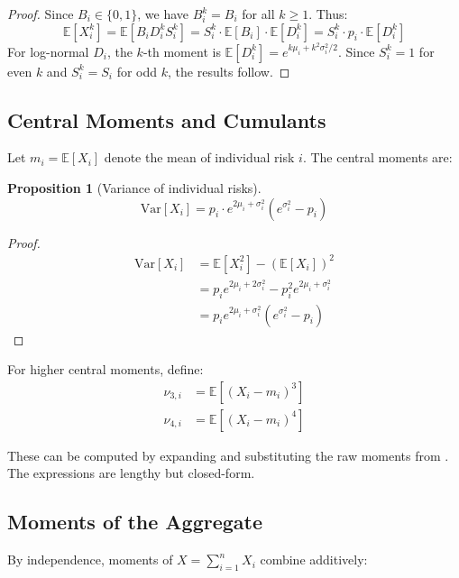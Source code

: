 \documentclass[12pt,a4paper]{article}
\newtheorem{proposition}[theorem]{Proposition}
\theoremstyle{definition}
\theoremstyle{remark}
\newcommand{\E}{\mathbb{E}}
\newcommand{\Var}{\mathrm{Var}}
\begin{document}
\begin{proof}
Since $B_i \in \{0,1\}$, we have $B_i^k = B_i$ for all $k \geq 1$. Thus:
\[
\E[X_i^k] = \E[B_i D_i^k S_i^k] = S_i^k \cdot \E[B_i] \cdot \E[D_i^k] = S_i^k \cdot p_i \cdot \E[D_i^k]
\]
For log-normal $D_i$, the $k$-th moment is $\E[D_i^k] = e^{k\mu_i + k^2\sigma_i^2/2}$. Since $S_i^k = 1$ for even $k$ and $S_i^k = S_i$ for odd $k$, the results follow.
\end{proof}

\subsection{Central Moments and Cumulants}

Let $m_i = \E[X_i]$ denote the mean of individual risk $i$. The central moments are:

\begin{proposition}[Variance of individual risks]
\label{prop:individual_variance}
\begin{equation}
    \Var[X_i] = p_i \cdot e^{2\mu_i + \sigma_i^2}(e^{\sigma_i^2} - p_i)
\end{equation}
\end{proposition}

\begin{proof}
\begin{align*}
\Var[X_i] &= \E[X_i^2] - (\E[X_i])^2 \\
&= p_i e^{2\mu_i + 2\sigma_i^2} - p_i^2 e^{2\mu_i + \sigma_i^2} \\
&= p_i e^{2\mu_i + \sigma_i^2}(e^{\sigma_i^2} - p_i)
\end{align*}
\end{proof}

For higher central moments, define:
\begin{align}
    \nu_{3,i} &= \E[(X_i - m_i)^3] \\
    \nu_{4,i} &= \E[(X_i - m_i)^4]
\end{align}

These can be computed by expanding and substituting the raw moments from . The expressions are lengthy but closed-form.

\subsection{Moments of the Aggregate}

By independence, moments of $X = \sum_{i=1}^n X_i$ combine additively:
\end{document}
